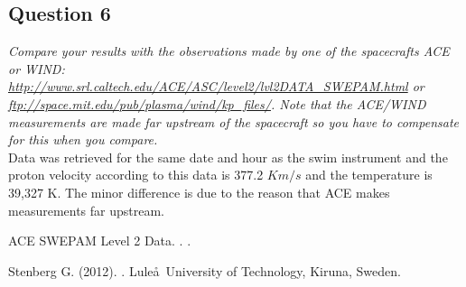 \documentclass{article}
\begin{document}
\subsection{Question 6}
\textit{Compare your results with the observations made by one of the spacecrafts ACE or WIND: \url{http://www.srl.caltech.edu/ACE/ASC/level2/lvl2DATA_SWEPAM.html} or \url{ftp://space.mit.edu/pub/plasma/wind/kp_files/}. Note that the ACE/WIND measurements are made far upstream of the spacecraft so you have to compensate for this when you compare.}\\

Data was retrieved for the same date and hour as the swim instrument and the proton velocity according to this data is 377.2 $Km/s$ and the temperature is 39,327 K. The minor difference is due to the reason that ACE makes measurements far upstream. \cite{ACE:measurements}

	
\clearpage


\newpage
\begin{thebibliography}{9}

ACE SWEPAM Level 2 Data.
.
.

Stenberg G.  (2012).
.
\newblock Lule\aa \ University of Technology, Kiruna, Sweden.

\end{thebibliography}
\end{document}
